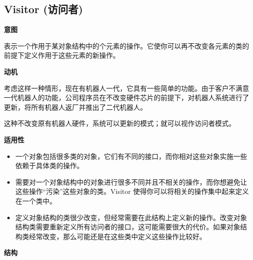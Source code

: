 \subsection{Visitor (访问者)}

\noindent\textbf{意图}

表示一个作用于某对象结构中的个元素的操作。它使你可以再不改变各元素的类的前提下定义作用于这些元素的新操作。

\noindent\textbf{动机}

考虑这样一种情形，现在有机器人一代，它具有一些简单的功能。由于客户不满意一代机器人的功能，公司程序员在不改变硬件芯片的前提下，对机器人系统进行了更新，将所有机器人返厂并推出了二代机器人。

这种不改变原有机器人硬件，系统可以更新的模式；就可以视作访问者模式。

\noindent\textbf{适用性}

\begin{itemize}
    \item 一个对象包括很多类的对象，它们有不同的接口，而你相对这些对象实施一些依赖于具体类的操作。
    \item 需要对一个对象结构中的对象进行很多不同并且不相关的操作，而你想避免让这些操作``污染''这些对象的类。Visitor 使得你可以将相关的操作集中起来定义在一个类中。
    \item 定义对象结构的类很少改变，但经常需要在此结构上定义新的操作。改变对象结构类需要重新定义所有访问者的接口，这可能需要很大的代价。如果对象结构类经常改变，那么可能还是在这些类中定义这些操作比较好。
\end{itemize}

\noindent\textbf{结构}

